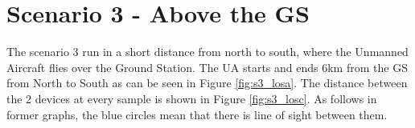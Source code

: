\newpage
\section{Scenario 3 - Above the GS}\label{sec:scenario3}
The scenario 3 run in a short distance from north to south, where the Unmanned Aircraft flies over the Ground Station. The UA starts and ends 6km from the GS from North to South as can be seen in Figure \ref{fig:s3_losa}. The distance between the 2 devices at every sample is shown in Figure \ref{fig:s3_losc}. As follows in former graphs, the blue circles mean that there is line of sight between them. 


\begin{figure}[H]
	\centering

\end{figure}
